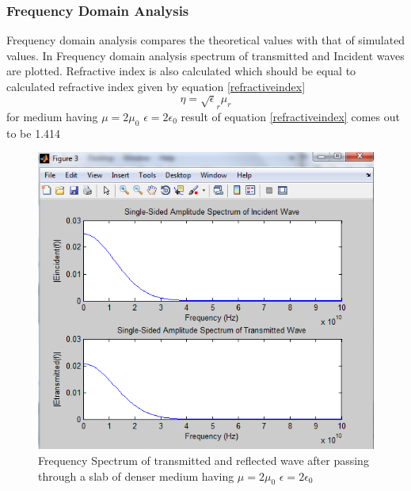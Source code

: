 \subsubsection{Frequency Domain Analysis}
Frequency domain analysis compares the theoretical values with that of simulated values.
 In Frequency domain analysis spectrum of transmitted and Incident waves are plotted. 
Refractive index is also calculated which should be equal to calculated refractive index given by equation \eqref{refractiveindex}
\begin{equation}
	\eta=\sqrt\epsilon_r\mu_r
\label{refractiveindex}
\end{equation}
for medium having $\mu=2\mu_0$  $\epsilon=2\epsilon_0$ result of equation \eqref{refractiveindex} comes out to be 1.414

\begin{figure}[htbp]
	\centering
		\includegraphics[width=5in]{Figures/fft1.png}
	\caption[Frequency Spectrum of 1D denser medium slab]{Frequency Spectrum of transmitted and reflected wave after passing through a slab of denser medium having $\mu=2\mu_0$  $\epsilon=2\epsilon_0$ }
	\label{fig:fft1}
\end{figure}

